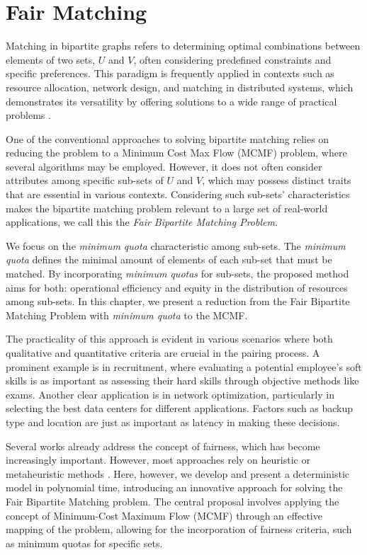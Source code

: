 \chapter{Fair Matching} \label{chap:fair_matching}
    
    Matching in bipartite graphs refers to determining optimal combinations between elements of two sets, $U$ and $V$, often considering predefined constraints and specific preferences. 
    This paradigm is frequently applied in contexts such as resource allocation, network design, and matching in distributed systems, which demonstrates its versatility by offering solutions to a wide range of practical problems \cite{Karp1972}.
    
    One of the conventional approaches to solving bipartite matching relies on reducing the problem to a Minimum Cost Max Flow (MCMF) problem, where several algorithms may be employed.
    However, it does not often consider attributes among specific sub-sets of $U$ and $V$, which may possess distinct traits that are essential in various contexts.
    Considering such sub-sets' characteristics makes the bipartite matching problem relevant to a large set of real-world applications, we call this the \emph{Fair Bipartite Matching Problem}.

    We focus on the \emph{minimum quota} characteristic among sub-sets.
    The \emph{minimum quota} defines the minimal amount of elements of each sub-set that must be matched.  %
    By incorporating \emph{minimum quotas} for sub-sets, the proposed method aims for both: operational efficiency and equity in the distribution of resources among sub-sets. 
    In this chapter, we present a reduction from the Fair Bipartite Matching Problem with \emph{minimum quota} to the MCMF.

    The practicality of this approach is evident in various scenarios where both qualitative and quantitative criteria are crucial in the pairing process. 
    A prominent example is in recruitment, where evaluating a potential employee's soft skills is as important as assessing their hard skills through objective methods like exams. 
    Another clear application is in network optimization, particularly in selecting the best data centers for different applications. 
    Factors such as backup type and location are just as important as latency in making these decisions.
    
    Several works already address the concept of fairness, which has become increasingly important. However, most approaches rely on heuristic \cite{hatfield2005matching, rostami2018fairness, pappalardo2020algorithmic} or metaheuristic methods \cite{manlove2017algorithmics, yan2021metaheuristic, chapman2017matching}. Here, however, we develop and present a deterministic model in polynomial time, introducing an innovative approach for solving the Fair Bipartite Matching problem. The central proposal involves applying the concept of Minimum-Cost Maximum Flow (MCMF) through an effective mapping of the problem, allowing for the incorporation of fairness criteria, such as minimum quotas for specific sets.

